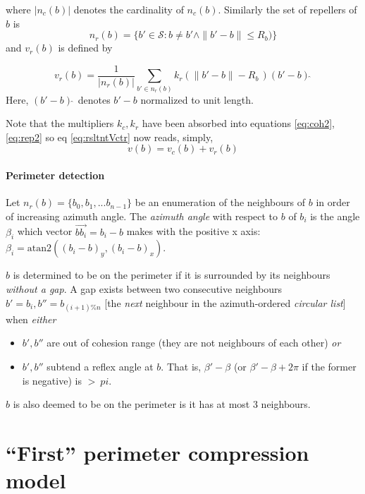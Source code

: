 \documentclass[12pt,a4paper]{article}
\begin{document}
where $|n_c(b)|$ denotes the cardinality of $n_c(b)$. Similarly the set of repellers of $b$ is
\begin{equation}\label{eq:rep1}
n_r(b) = \{b' \in \mathcal{S} : b \neq b' \wedge \|b' - b\| \leq R_b)\}
\end{equation}
and $v_r(b)$ is defined by

\begin{equation}\label{eq:rep2}
v_r(b) = \frac{1}{|n_r(b)|}\sum_{b' \in n_r(b)} k_r \left(\|b' - b\| - R_b \, \right) (b'-b)\hat~
\end{equation}
Here, $(b'-b)\hat~$ denotes $b'-b$ normalized to unit length.

Note that the multipliers $k_c, k_r$ have been absorbed into equations \ref{eq:coh2}, \ref{eq:rep2} so eq \ref{eq:rsltntVctr} now reads, simply,
\begin{equation}\label{eq:newModel2}
v(b) = v_c(b) + v_r(b)
\end{equation}

\paragraph{Perimeter detection}
Let $n_r(b) = \{b_0, b_1, ... b_{n-1}\}$ be an enumeration of the neighbours of $b$ in order of increasing azimuth angle. The \emph{azimuth angle} with respect to $b$ of $b_i$ is the angle $\beta_i$ which vector $\vec{bb_i} = b_i - b$ makes with the positive x axis: $\beta_i = \text{atan2}((b_i - b)_y, (b_i - b)_x)$.

$b$ is determined to be on the perimeter if it is surrounded by its neighbours \emph{without a gap}. A gap exists between two consecutive neighbours $b' = b_i, b'' = b_{(i+1)\%n}$ [the \emph{next} neighbour in the azimuth-ordered \emph{circular list}] when \emph{either}
\begin{itemize}
\item $b', b''$ are out of cohesion range (they are not neighbours of each other) \emph{or}
\item $b', b''$ subtend a reflex angle at $b$. That is, $\beta' - \beta$ (or $\beta' - \beta + 2\pi$ if the former is negative) is $> \ pi$.
\end{itemize}

$b$ is also deemed to be on the perimeter is it has at most 3 neighbours.


\section{``First'' perimeter compression model}
\end{document}
